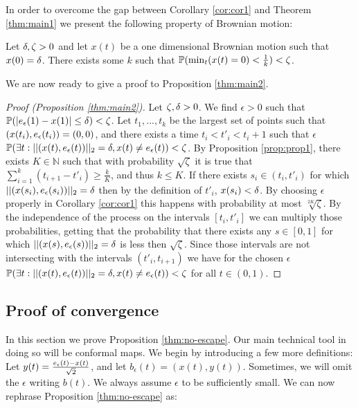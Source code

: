 {In order to overcome the gap between Corollary \ref{cor:cor1} and
Theorem \ref{thm:main1} we present the following property of Brownian
motion:
\begin{propos}\label{prop:prop1}
Let $\radius,\zeta>0$ and let $x(t)$ be a one dimensional Brownian
motion such that $x(0)=\radius$. There exists some $k$ such that
$\P(\min_t(x(t)=0)<\frac1k)<\zeta$.
\end{propos}

We are now ready to give a proof to Proposition \ref{thm:main2}.

\begin{proof}[Proof (Proposition \ref{thm:main2})]
\newcommand{\hitradius}[1]{\twonorm{\twodproc{#1}}=\radius}

Let $\zeta,\radius>0$. We find $\epsilon>0$ such that
$\P(|\eeps(1)- x(1)|\le\radius)<\zeta$. Let $t_1,...,t_k$ be
the largest set of points such that $\twodproc{t_i}=(0,0)$, and there exists a time
$t_i<t'_i<t_i+1$ such that $\epsilon$ $\P(\exists t
: \hitradius{t}, x(t)\not=\eeps(t))<\zeta$. By Proposition
\ref{prop:prop1}, there exists $K\in\mathbb{N}$ such that with
probability $\sqrt\zeta$ it is true that
$\sum_{i=1}^k(t_{i+1}-t'_i)\ge\frac{k}{K}$, and thus $k\le K$. If there exists
$s_i\in (t_i, t'_i)$ for which
$\hitradius{s_i}$ then by the definition of
$t'_i$, $x(s_i)<\radius$. By choosing $\epsilon$ properly in
Corollary \ref{cor:cor1} this happens with probability at most
$\sqrt[2K]{\zeta}$. By the independence of the process on the intervals
$[t_i,t'_i]$ we can multiply those probabilities, getting that the
probability that there exists any $s\in[0,1]$ for which
$\hitradius{s}$ is less then
$\sqrt\zeta$. Since those intervals are not intersecting with the
intervals $(t'_i,t_{i+1})$ we have for the chosen $\epsilon$ $\P(\exists t
: \hitradius{t}, x(t)\not=\eeps(t))<\zeta$
for all $t\in(0,1)$.
\end{proof}

\subsection{Proof of convergence}\label{sec:POC}
In this section we prove Proposition \ref{thm:no-escape}. Our main technical tool in doing so will
be conformal maps. We begin by introducing a few more definitions: Let
$y(t)=\frac{\eeps(t)-x(t)}{\sqrt2}$, and let
${b}_\epsilon(t)=(x(t),y(t))$. Sometimes, we will omit the $\epsilon$ writing $b(t)$. We always assume $\epsilon$
to be sufficiently small. We can now rephrase Proposition
\ref{thm:no-escape} as:

}
